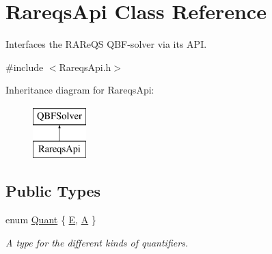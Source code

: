 \hypertarget{classRareqsApi}{\section{Rareqs\-Api Class Reference}
\label{classRareqsApi}
}


Interfaces the R\-A\-Re\-Q\-S Q\-B\-F-\/solver via its A\-P\-I.  




{\ttfamily \#include $<$Rareqs\-Api.\-h$>$}

Inheritance diagram for Rareqs\-Api\-:\begin{figure}[H]
\begin{center}
\leavevmode
\includegraphics[height=2.000000cm]{classRareqsApi}
\end{center}
\end{figure}
\subsection*{Public Types}
\begin{DoxyCompactItemize}
\item 
enum \hyperlink{classQBFSolver_ac091e263cb55286cc07b2451bcf4d3c7}{Quant} \{ \hyperlink{classQBFSolver_ac091e263cb55286cc07b2451bcf4d3c7a090ab4a5b262710ccd80e97d72f9a7b3}{E}, 
\hyperlink{classQBFSolver_ac091e263cb55286cc07b2451bcf4d3c7afd6518d5d985aa8346ac071e4c0d8ee0}{A}
 \}
\begin{DoxyCompactList}\small\item\em A type for the different kinds of quantifiers. \end{DoxyCompactList}\end{DoxyCompactItemize}
